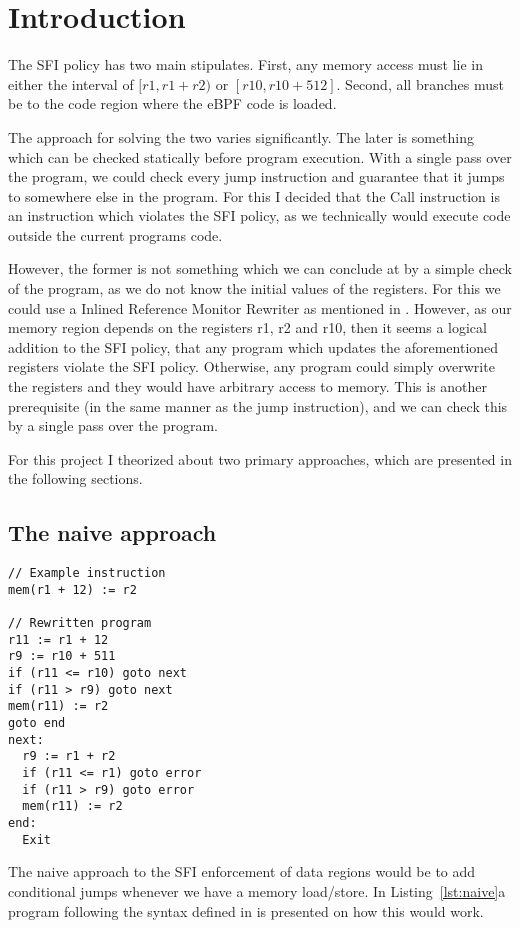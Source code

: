 \section{Introduction}
The SFI policy has two main stipulates. First, any memory access must lie in
either the interval of $[r1, r1 + r2)$ or $[r10, r10+512]$. Second, all
branches must be to the code region where the eBPF code is loaded.

The approach for solving the two varies significantly. The later is something
which can be checked statically before program execution. With a single pass
over the program, we could check every jump instruction and guarantee that it
jumps to somewhere else in the program. For this I decided that the Call
instruction is an instruction which violates the SFI policy, as we technically
would execute code outside the current programs code. 

However, the former is not something which we can conclude at by a simple check
of the program, as we do not know the initial values of the registers. For this
we could use a Inlined Reference Monitor Rewriter as mentioned in \cite{SFI}.
However, as our memory region depends on the registers r1, r2 and r10, then it
seems a logical addition to the SFI policy, that any program which updates the
aforementioned registers violate the SFI policy. Otherwise, any program could
simply overwrite the registers and they would have arbitrary access to memory.
This is another prerequisite (in the same manner as the jump instruction), and
we can check this by a single pass over the program.

For this project I theorized about two primary approaches, which are presented in the following sections.

\subsection{The naive approach}
\begin{lstlisting}[caption={Example program}, label={lst:naive}]
// Example instruction
mem(r1 + 12) := r2

// Rewritten program
r11 := r1 + 12
r9 := r10 + 511
if (r11 <= r10) goto next
if (r11 > r9) goto next
mem(r11) := r2
goto end
next:
  r9 := r1 + r2
  if (r11 <= r1) goto error
  if (r11 > r9) goto error
  mem(r11) := r2
end:
  Exit
\end{lstlisting}
The naive approach to the SFI enforcement of data regions would be to add
conditional jumps whenever we have a memory load/store. In
Listing~\ref{lst:naive}a program following the syntax defined in \cite{SFI} is
presented on how this would work.

